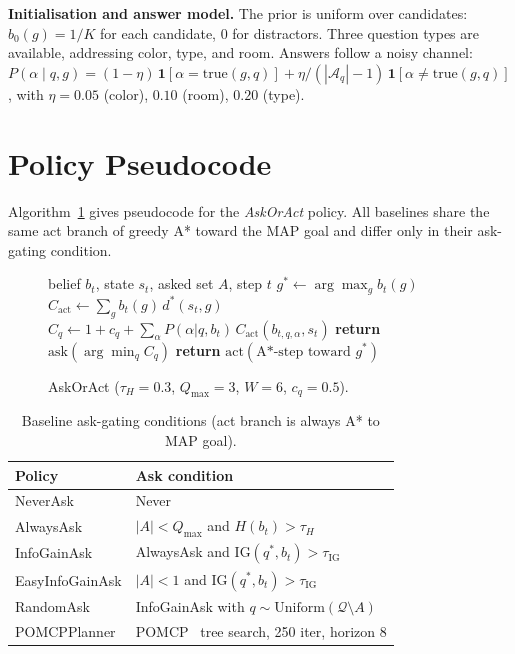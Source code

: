 \documentclass[10pt,twocolumn]{article}
\begin{document}
\textbf{Initialisation and answer model.}
The prior is uniform over candidates: $b_0(g) = 1/K$ for each candidate, $0$ for distractors.
Three question types are available, addressing color, type, and room.
Answers follow a noisy channel: $P(\alpha \mid q, g) = (1{-}\eta)\,\mathbf{1}[\alpha {=} \mathrm{true}(g,q)] + \eta/(|\mathcal{A}_q|{-}1)\,\mathbf{1}[\alpha {\neq} \mathrm{true}(g,q)]$, with $\eta{=}0.05$ (color), $0.10$ (room), $0.20$ (type).

\section{Policy Pseudocode}
\label{app:pseudocode}

Algorithm~\ref{alg:askoract} gives pseudocode for the \textit{AskOrAct} policy.
All baselines share the same act branch of greedy A* toward the MAP goal and differ only in their ask-gating condition.

\begin{figure}[h]
\small
\begin{algorithmic}[1]
\Require belief $b_t$, state $s_t$, asked set $A$, step $t$
\State $g^* \gets \arg\max_g b_t(g)$  
\State $C_{\mathrm{act}} \gets \sum_g b_t(g)\,d^*(s_t, g)$
    \State $C_q \gets 1 + c_q + \sum_\alpha P(\alpha|q,b_t)\,C_{\mathrm{act}}(b_{t,q,\alpha},s_t)$
  \EndFor
    \State \textbf{return} $\mathrm{ask}(\arg\min_q C_q)$
  \EndIf
\EndIf
\State \textbf{return} $\mathrm{act}(\text{A*-step toward } g^*)$
\end{algorithmic}
\caption{AskOrAct ($\tau_H{=}0.3$, $Q_{\max}{=}3$, $W{=}6$, $c_q{=}0.5$).}
\label{alg:askoract}
\end{figure}

\begin{table}[h]
\centering
\caption{Baseline ask-gating conditions (act branch is always A* to MAP goal).}
\label{tab:baselines_conditions}
\small
\begin{tabular}{lp{4.2cm}}
\toprule
Policy & Ask condition \\
\midrule
NeverAsk & Never \\
AlwaysAsk & $|A|<Q_{\max}$ and $H(b_t)>\tau_H$ \\
InfoGainAsk & AlwaysAsk and $\mathrm{IG}(q^*,b_t)>\tau_{\mathrm{IG}}$ \\
EasyInfoGainAsk & $|A|<1$ and $\mathrm{IG}(q^*,b_t)>\tau_{\mathrm{IG}}$ \\
RandomAsk & InfoGainAsk with $q \sim \mathrm{Uniform}(\mathcal{Q}\setminus A)$ \\
POMCPPlanner & POMCP~\cite{silver2010pomcp} tree search, 250 iter, horizon 8 \\
\bottomrule
\end{tabular}
\end{table}
\end{document}
